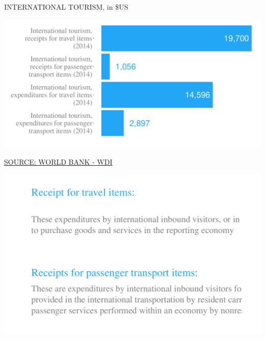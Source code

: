 \documentclass{article}\usepackage[]{graphicx}\usepackage[]{color}
\makeatletter
\def\maxwidth{ %
  \ifdim\Gin@nat@width>\linewidth
    \linewidth
  \else
    \Gin@nat@width
  \fi
}
\makeatother
\begin{document}
\begin{minipage}[c]{0.95\textwidth}
  \vspace{5ex}
    \begin{minipage}[c]{0.5\textwidth}
      \hspace{4ex}\small{\textcolor[HTML]{818181}{INTERNATIONAL TOURISM, in \$US}}
      \vspace{1ex}


{\centering \includegraphics[width=\maxwidth]{figure/bar2_2-1} 

}



      \hspace{4ex}\scriptsize{\href{NA}{\textcolor[HTML]{FF4023}{SOURCE: WORLD BANK - WDI}}}
    \end{minipage}
    \begin{minipage}[c]{0.5\textwidth}  
      \hspace{4ex}\small{\textcolor[HTML]{818181}{}}
    \vspace{1ex}


{\centering \includegraphics[width=\maxwidth]{figure/text2_1-1} 

}



      \hspace{4ex}\scriptsize{\href{NA}{\textcolor[HTML]{FF4023}{}}}
    \end{minipage}
\end{minipage}
\end{document}
